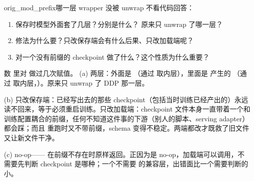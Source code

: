 \begin{checkpoint}{orig_mod_prefix}{哪一层 wrapper 没被 unwrap}
不看代码回答：
\begin{enumerate}[label=(\alph*)]
  \item 保存时模型外面套了几层？分别是什么？ 原来只 unwrap 了哪一层？
  \item 修法为什么要？只改保存端会有什么后果、只改加载端呢？
  \item {} 对一个没有前缀的 checkpoint 做了什么？这个性质为什么重要？
\end{enumerate}
\hint 数  里对  做过几次赋值。
\ifshowanswers
\tcblower
\answer (a) 两层：外面是 （通过  取内层），里面是  产生的 （通过  取内层，）。原来只 unwrap 了 DDP 那一层。

(b) 只改保存端：已经写出去的那些 checkpoint（包括当时训练已经产出的）永远读不回来，等于必须重启训练。只改加载端：checkpoint 文件本身一直带着一个和训练配置耦合的前缀，任何不知道这件事的下游（别人的脚本、serving adapter）都会踩；而且  重跑时又不带前缀，schema 变得不稳定。两端都改才既救了旧文件又让新文件干净。

(c) no-op—— 在前缀不存在时原样返回。正因为是 no-op，加载端可以调用，不需要先判断 checkpoint 是哪种；一个不需要  的兼容层，出错面比一个需要判断的小。
\whereincode {}
\fi
\end{checkpoint}

